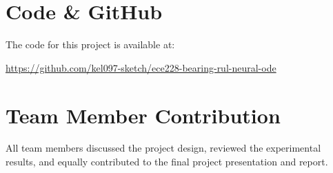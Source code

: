 \documentclass{article}
\begin{document}
\section{Code \& GitHub}

The code for this project is available at:

\url{https://github.com/kel097-sketch/ece228-bearing-rul-neural-ode}

\section{Team Member Contribution}
All team members discussed the project design, reviewed the experimental results, and equally contributed to the final project presentation and report.

\appendix



\FloatBarrier


\end{document}

